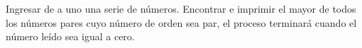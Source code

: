 Ingresar de a uno una serie de números. Encontrar e imprimir el mayor de todos los números pares cuyo número de orden sea par, el proceso terminará cuando el número leído sea igual a cero.
